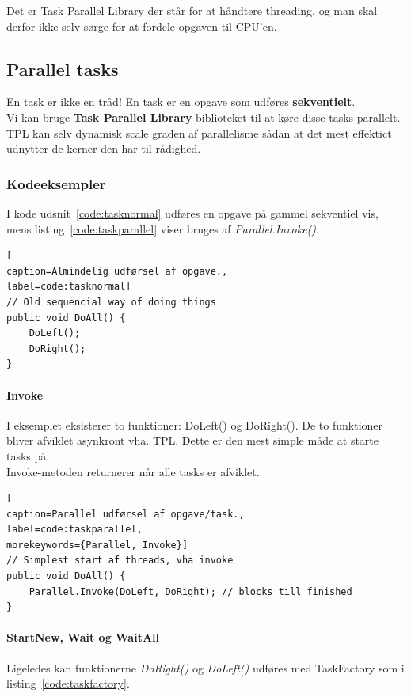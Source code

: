 Det er Task Parallel Library der står for at håndtere threading, og man skal derfor ikke selv sørge for at fordele opgaven til CPU'en. 

\subsection{Parallel tasks}

En task er ikke en tråd! En task er en opgave som udføres \textbf{sekventielt}.\\

Vi kan bruge \textbf{Task Parallel Library} biblioteket til at køre disse tasks parallelt. TPL kan selv dynamisk scale graden af parallelisme sådan at det mest effektict udnytter de kerner den har til rådighed.

\subsubsection{Kodeeksempler}

I kode udsnit~\ref{code:tasknormal} udføres en opgave på gammel sekventiel vis, mens listing~\ref{code:taskparallel} viser bruges af \textit{Parallel.Invoke()}.

\begin{lstlisting}[
caption=Almindelig udførsel af opgave.,
label=code:tasknormal]
// Old sequencial way of doing things
public void DoAll() {
	DoLeft();
	DoRight();
}
\end{lstlisting}

\paragraph{Invoke}
I eksemplet eksisterer to funktioner: DoLeft() og DoRight(). De to funktioner bliver afviklet asynkront vha. TPL. Dette er den mest simple måde at starte tasks på.\\

Invoke-metoden returnerer når alle tasks er afviklet.
\begin{lstlisting}[
caption=Parallel udførsel af opgave/task.,
label=code:taskparallel,
morekeywords={Parallel, Invoke}]
// Simplest start af threads, vha invoke
public void DoAll() {
	Parallel.Invoke(DoLeft, DoRight); // blocks till finished
}
\end{lstlisting}

\paragraph{StartNew, Wait og WaitAll}
Ligeledes kan funktionerne \textit{DoRight()} og \textit{DoLeft()} udføres med TaskFactory som i listing~\ref{code:taskfactory}.

